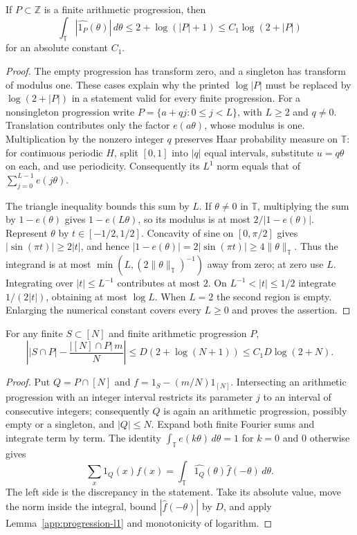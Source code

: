 \begin{lemma}
\label{app:progression-l1}
\leanok
If $P\subset\mathbb Z$ is a finite arithmetic progression, then
\[
 \int_{\mathbb T}|\widehat{1_P}(\theta)|\,d\theta
 \leq 2+\log(|P|+1)\leq C_1\log(2+|P|)
\]
for an absolute constant $C_1$.
\end{lemma}
\begin{proof}
The empty progression has transform zero, and a singleton has transform of
modulus one.  These cases explain why the printed $\log|P|$ must be replaced
by $\log(2+|P|)$ in a statement valid for every finite progression.
For a nonsingleton progression write
$P=\{a+qj:0\leq j<L\}$, with $L\geq2$ and $q\ne0$.  Translation contributes
only the factor $e(a\theta)$, whose modulus is one.  Multiplication by the
nonzero integer $q$ preserves Haar probability measure on $\mathbb T$:
for continuous periodic $H$, split $[0,1]$ into $|q|$ equal intervals,
substitute $u=q\theta$ on each, and use periodicity.  Consequently its
$L^1$ norm equals that of $\sum_{j=0}^{L-1}e(j\theta)$.

The triangle inequality bounds this sum by $L$.  If
$\theta\ne0$ in $\mathbb T$, multiplying the sum by $1-e(\theta)$ gives
$1-e(L\theta)$, so its modulus is at most $2/|1-e(\theta)|$.
Represent $\theta$ by $t\in[-1/2,1/2]$.  Concavity of sine on
$[0,\pi/2]$ gives $|\sin(\pi t)|\geq2|t|$, and hence
$|1-e(\theta)|=2|\sin(\pi t)|\geq4\|\theta\|_{\mathbb T}$.
Thus the integrand is at most
$\min(L,(2\|\theta\|_{\mathbb T})^{-1})$ away from zero; at zero use $L$.
Integrating over $|t|\leq L^{-1}$ contributes at most $2$.
On $L^{-1}<|t|\leq1/2$ integrate $1/(2|t|)$, obtaining at most
$\log L$.  When $L=2$ the second region is empty.  Enlarging the numerical
constant covers every $L\geq0$ and proves the assertion.
\end{proof}

\begin{lemma}
\label{app:progression-discrepancy}
\leanok
{}
For any finite $S\subset[N]$ and finite arithmetic progression $P$,
\[
 \left||S\cap P|-\frac{|[N]\cap P|\,m}{N}\right|
 \leq D(2+\log(N+1))\leq C_1D\log(2+N).
\]
\end{lemma}
\begin{proof}
Put $Q=P\cap[N]$ and $f=1_S-(m/N)1_{[N]}$.  Intersecting an arithmetic
progression with an integer interval restricts its parameter $j$ to an
interval of consecutive integers; consequently $Q$ is again an arithmetic
progression, possibly empty or a singleton, and $|Q|\leq N$.
Expand both finite Fourier sums and integrate term by term.  The identity
$\int_{\mathbb T}e(k\theta)\,d\theta=1$ for $k=0$ and $0$ otherwise gives
\[
 \sum_x1_Q(x)f(x)
 =\int_{\mathbb T}\widehat{1_Q}(\theta)\widehat f(-\theta)\,d\theta.
\]
The left side is the discrepancy in the statement.  Take its absolute value,
move the norm inside the integral, bound $|\widehat f(-\theta)|$ by $D$,
and apply Lemma~\ref{app:progression-l1} and monotonicity of logarithm.
\end{proof}

